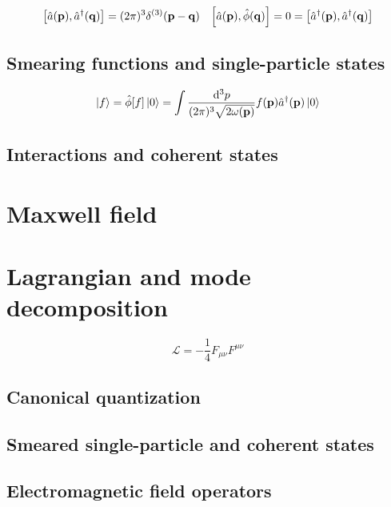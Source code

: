 \begin{align}
	\comm{\hat{a}(\vb{p})}{\hat{a}^\dagger(\vb{q})}
	=
	(2\pi)^3\delta^{(3)}(\vb{p}-\vb{q})
	&&
	\comm{\hat{a}(\vb{p})}{\hat\phi(\vb{q})}
	=
	0
	=
	\comm{\hat{a}^\dagger(\vb{p})}{\hat{a}^\dagger(\vb{q})}
	\label{eq:kg_comm_ac}
\end{align}

\subsection{Smearing functions and single-particle states}

\begin{equation}
	\ket{f}
	=
	\hat\phi[f]
	\ket{0}
	=
	\int\frac{\dd[3]{p}}{(2\pi)^3\sqrt{2\omega(\vb{p})}}
	f(\vb{p})\hat{a}^\dagger(\vb{p})\ket{0}
\end{equation}

\subsection{Interactions and coherent states}

\section{Maxwell field}

\section{Lagrangian and mode decomposition}

\begin{equation}
	\mathcal{L}
	=
	-
	\frac{1}{4}
	F_{\mu\nu}
	F^{\mu\nu}
	\label{eq:mw_lagrangian}
\end{equation}

\subsection{Canonical quantization}

\subsection{Smeared single-particle and coherent states}

\subsection{Electromagnetic field operators}